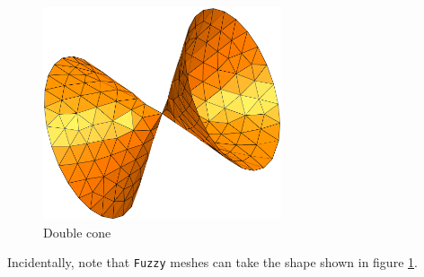 \begin{figure}[ht] \centering
  \includegraphics[width=70mm]{yo-yo}
  \caption{Double cone}
  \label{\numb section 12.\numb fig 11}
\end{figure}

Incidentally, note that {\small\tt Fuzzy} meshes can take the shape shown in figure
\ref{\numb section 12.\numb fig 11}.

